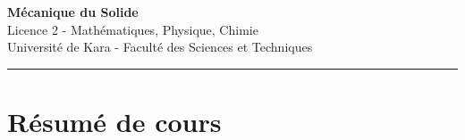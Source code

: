 \documentclass[12pt,a4paper]{article}
\begin{document}
\fi

\begin{center}
  {\LARGE\bfseries Mécanique du Solide}\\[6pt]
  {\large Licence 2 - Mathématiques, Physique, Chimie}\\[4pt]
  {\normalsize Université de Kara - Faculté des Sciences et Techniques}
\end{center}

\vspace{8pt}
\hrule
\vspace{12pt}

\section{Résumé de cours}
\end{document}
